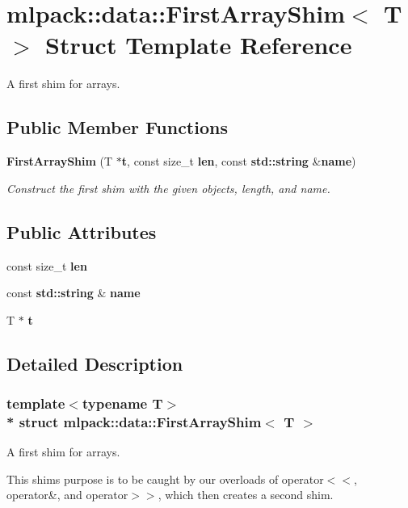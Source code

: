 \section{mlpack\+:\+:data\+:\+:First\+Array\+Shim$<$ T $>$ Struct Template Reference}
\label{structmlpack_1_1data_1_1FirstArrayShim}


A first shim for arrays.  


\subsection*{Public Member Functions}
\begin{DoxyCompactItemize}
\item 
{\bf First\+Array\+Shim} (T $\ast${\bf t}, const size\+\_\+t {\bf len}, const {\bf std\+::string} \&{\bf name})
\begin{DoxyCompactList}\small\item\em Construct the first shim with the given objects, length, and name. \end{DoxyCompactList}\end{DoxyCompactItemize}
\subsection*{Public Attributes}
\begin{DoxyCompactItemize}
\item 
const size\+\_\+t {\bf len}
\item 
const {\bf std\+::string} \& {\bf name}
\item 
T $\ast$ {\bf t}
\end{DoxyCompactItemize}


\subsection{Detailed Description}
\subsubsection*{template$<$typename T$>$\\*
struct mlpack\+::data\+::\+First\+Array\+Shim$<$ T $>$}

A first shim for arrays. 

This shim\textquotesingle{}s purpose is to be caught by our overloads of operator$<$$<$, operator\&, and operator$>$$>$, which then creates a second shim. 

